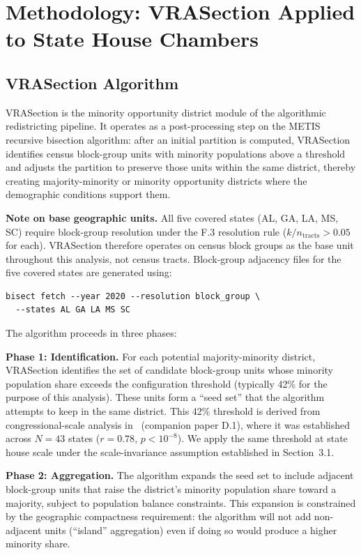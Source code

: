 \section{Methodology: VRASection Applied to State House Chambers}
\label{sec:methodology}

\subsection{VRASection Algorithm}

VRASection is the minority opportunity district module of the algorithmic redistricting pipeline. It operates as a post-processing step on the METIS recursive bisection algorithm: after an initial partition is computed, VRASection identifies census block-group units with minority populations above a threshold and adjusts the partition to preserve those units within the same district, thereby creating majority-minority or minority opportunity districts where the demographic conditions support them.

\textbf{Note on base geographic units.} All five covered states (AL, GA, LA, MS, SC) require block-group resolution under the F.3 resolution rule ($k/n_{\mathrm{tracts}} > 0.05$ for each). VRASection therefore operates on census block groups as the base unit throughout this analysis, not census tracts. Block-group adjacency files for the five covered states are generated using:
\begin{verbatim}
bisect fetch --year 2020 --resolution block_group \
  --states AL GA LA MS SC
\end{verbatim}

The algorithm proceeds in three phases:

\textbf{Phase 1: Identification.} For each potential majority-minority district, VRASection identifies the set of candidate block-group units whose minority population share exceeds the configuration threshold (typically 42\% for the purpose of this analysis). These units form a ``seed set'' that the algorithm attempts to keep in the same district.
This 42\% threshold is derived from congressional-scale analysis in~\cite{dellaLibera2026threshold} (companion paper D.1), where it was established across $N=43$ states ($r=0.78$, $p<10^{-8}$). We apply the same threshold at state house scale under the scale-invariance assumption established in Section~3.1.

\textbf{Phase 2: Aggregation.} The algorithm expands the seed set to include adjacent block-group units that raise the district's minority population share toward a majority, subject to population balance constraints. This expansion is constrained by the geographic compactness requirement: the algorithm will not add non-adjacent units (``island'' aggregation) even if doing so would produce a higher minority share.

